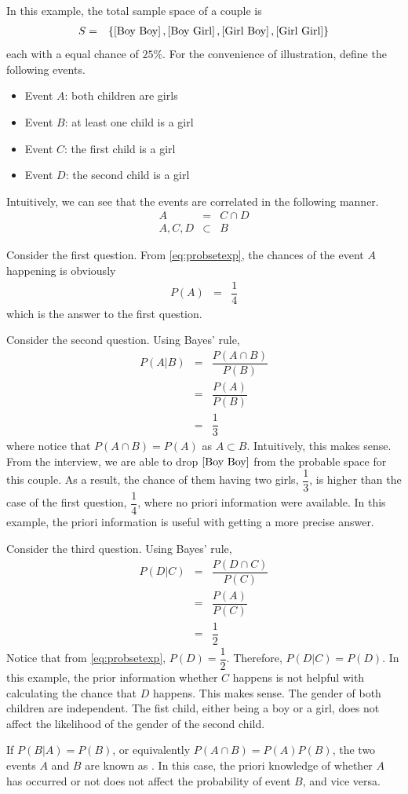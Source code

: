 In this example, the total sample space of a couple is 
\begin{eqnarray}
S &=& \left\{\left[\textup{Boy Boy}\right], \left[\textup{Boy Girl}\right], \left[\textup{Girl Boy}\right], \left[\textup{Girl Girl}\right]\right\} \label{eq:probsetexp}
\end{eqnarray}
each with a equal chance of $25\%$. For the convenience of illustration, define the following events.
\begin{itemize}
	\item Event $A$: both children are girls
	\item Event $B$: at least one child is a girl
	\item Event $C$: the first child is a girl
	\item Event $D$: the second child is a girl
\end{itemize}

Intuitively, we can see that the events are correlated in the following manner.
\begin{eqnarray}
	A &=& C \cap D \nonumber \\
	A, C, D &\subset& B \nonumber
\end{eqnarray}

Consider the first question. From \eqref{eq:probsetexp}, the chances of the event $A$ happening is obviously
\begin{eqnarray}
P(A) &=& \dfrac{1}{4} \nonumber
\end{eqnarray}
which is the answer to the first question.

Consider the second question. Using Bayes' rule,
\begin{eqnarray}
P(A|B) &=& \dfrac{P\left(A \cap B\right)}{P(B)} \nonumber \\
&=& \dfrac{P(A)}{P(B)} \nonumber \\
&=& \dfrac{1}{3} \nonumber
\end{eqnarray}
where notice that $P\left(A \cap B\right) = P(A)$ as $A\subset B$. Intuitively, this makes sense. From the interview, we are able to drop $\left[\textup{Boy Boy}\right]$ from the probable space for this couple. As a result, the chance of them having two girls, $\dfrac{1}{3}$, is higher than the case of the first question, $\dfrac{1}{4}$, where no priori information were available. In this example, the priori information is useful with getting a more precise answer.

Consider the third question. Using Bayes' rule,
\begin{eqnarray}
P(D|C) &=& \dfrac{P\left(D \cap C\right)}{P(C)} \nonumber \\
&=& \dfrac{P(A)}{P(C)} \nonumber \\
&=& \dfrac{1}{2} \nonumber
\end{eqnarray}
Notice that from \eqref{eq:probsetexp}, $P(D) = \dfrac{1}{2}$. Therefore, $P(D|C) = P(D)$. In this example, the prior information whether $C$ happens is not helpful with calculating the chance that $D$ happens. This makes sense. The gender of both children are independent. The fist child, either being a boy or a girl, does not affect the likelihood of the gender of the second child.

If $P(B|A)=P(B)$, or equivalently $P(A\cap B) = P(A)P(B)$, the two events $A$ and $B$ are known as . In this case, the priori knowledge of whether $A$ has occurred or not does not affect the probability of event $B$, and vice versa.
